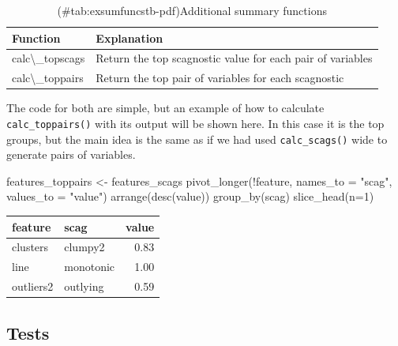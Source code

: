 \begin{Schunk}
\begin{table}

\caption{(\#tab:exsumfuncstb-pdf)Additional summary functions}
\centering
\begin{tabular}[t]{>{\raggedright\arraybackslash}p{3cm}l}
\toprule
Function & Explanation\\
\midrule
calc\textbackslash{}\_topscags & Return the top scagnostic value for each pair of variables\\
calc\textbackslash{}\_toppairs & Return the top pair of variables for each scagnostic\\
\bottomrule
\end{tabular}
\end{table}

\end{Schunk}

The code for both are simple, but an example of how to calculate
\texttt{calc\_toppairs()} with its output will be shown here. In this
case it is the top groups, but the main idea is the same as if we had
used \texttt{calc\_scags()} wide to generate pairs of variables.

\begin{Schunk}
\begin{Sinput}
features_toppairs <- features_scags %
  pivot_longer(!feature, names_to = "scag", values_to = "value") %
  arrange(desc(value)) %
  group_by(scag) %
  slice_head(n=1)
\end{Sinput}
\end{Schunk}

\begin{Schunk}

\begin{tabular}{>{\raggedright\arraybackslash}p{3cm}lr}
\toprule
feature & scag & value\\
\midrule
clusters & clumpy2 & 0.83\\
line & monotonic & 1.00\\
outliers2 & outlying & 0.59\\
\bottomrule
\end{tabular}

\end{Schunk}

\hypertarget{tests}{%
\subsection{Tests}\label{tests}}

